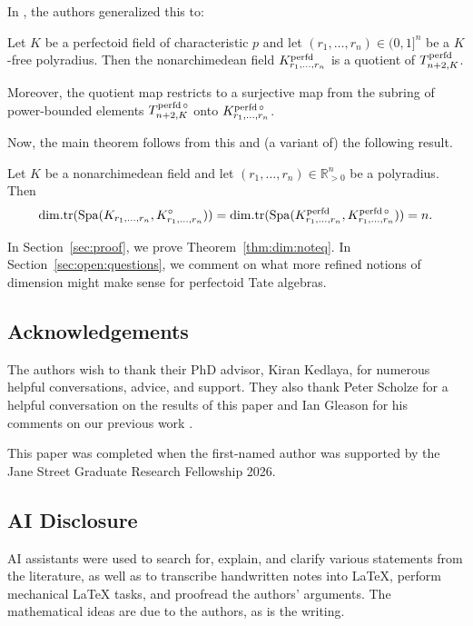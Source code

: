 In \cite{Dine-Garzella25}, the authors generalized this to:
\begin{thm}
    \label{thm:kr:bigquotient}Let $K$ be a perfectoid field of characteristic $p$ and let $(r_1,\dots, r_n)\in (0, 1]^{n}$ be a $K$-free polyradius. Then the nonarchimedean field
    \(K_{r_{1}, \ldots, r_{n}}^{\operatorname{perfd}}\) is a quotient of \(T_{n+2, K}^{\operatorname{perfd}}\). 
    
    Moreover, the quotient map restricts to a surjective map from the subring of power-bounded elements $T_{n+2, K}^{\operatorname{perfd}\circ}$ onto $K_{r_{1},\ldots, r_{n}}^{\operatorname{perfd}\circ}$.
\end{thm}
Now, the main theorem follows from this and (a variant of) the following result. 
\begin{thm}Let $K$ be a nonarchimedean field and let $(r_1,\dots, r_n)\in \mathbb{R}_{>0}^{n}$ be a polyradius. Then \begin{equation*}\mathrm{dim.tr}(\operatorname{Spa}(K_{r_{1}, \ldots, r_{n}}, K_{r_1,\dots, r_n}^{\circ}))=\mathrm{dim.tr}(\operatorname{Spa}(K_{r_1,\dots, r_{n}}^{\operatorname{perfd}}, K_{r_1,\dots, r_n}^{\operatorname{perfd}\circ}))=n.\end{equation*}\end{thm}
In Section~\ref{sec:proof}, we prove Theorem~\ref{thm:dim:noteq}.
In Section~\ref{sec:open:questions}, we comment on what more refined notions of dimension
might make sense for perfectoid Tate algebras.

\subsection{Acknowledgements}The authors wish to thank their PhD advisor, Kiran Kedlaya, for numerous helpful conversations, advice, and support. They also thank Peter Scholze for a helpful conversation on the results of this paper and Ian Gleason for his comments on our previous work \cite{Dine-Garzella25}. 

This paper was completed when the first-named author was supported by the Jane Street Graduate Research Fellowship 2026. 

\subsection{AI Disclosure}

AI assistants were used to search for, explain, and clarify
various statements from the literature, as well as to transcribe handwritten notes into LaTeX,
perform mechanical LaTeX tasks, and proofread the authors' arguments.
The mathematical ideas are due to the authors, as is the writing.

